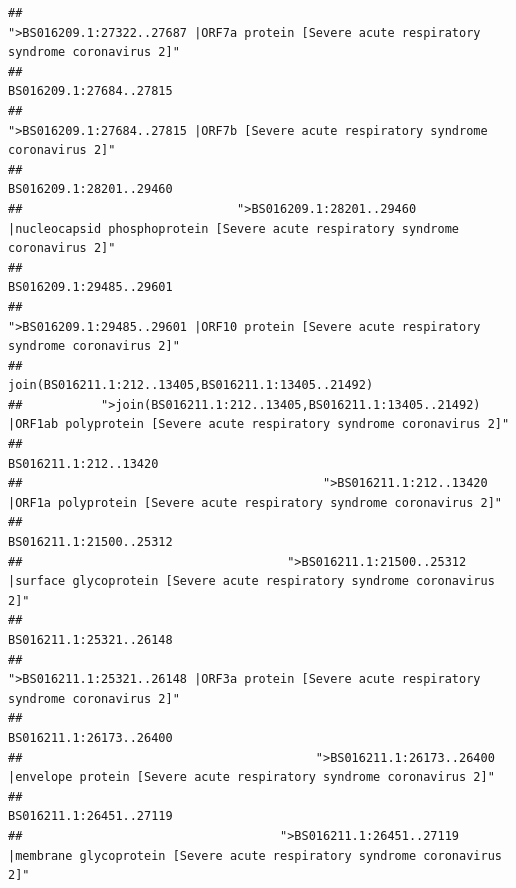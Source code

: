 \documentclass[
]{article}
\begin{document}
\begin{verbatim}
##                                            ">BS016209.1:27322..27687 |ORF7a protein [Severe acute respiratory syndrome coronavirus 2]" 
##                                                                                                                BS016209.1:27684..27815 
##                                                    ">BS016209.1:27684..27815 |ORF7b [Severe acute respiratory syndrome coronavirus 2]" 
##                                                                                                                BS016209.1:28201..29460 
##                              ">BS016209.1:28201..29460 |nucleocapsid phosphoprotein [Severe acute respiratory syndrome coronavirus 2]" 
##                                                                                                                BS016209.1:29485..29601 
##                                            ">BS016209.1:29485..29601 |ORF10 protein [Severe acute respiratory syndrome coronavirus 2]" 
##                                                                                    join(BS016211.1:212..13405,BS016211.1:13405..21492) 
##           ">join(BS016211.1:212..13405,BS016211.1:13405..21492) |ORF1ab polyprotein [Severe acute respiratory syndrome coronavirus 2]" 
##                                                                                                                  BS016211.1:212..13420 
##                                          ">BS016211.1:212..13420 |ORF1a polyprotein [Severe acute respiratory syndrome coronavirus 2]" 
##                                                                                                                BS016211.1:21500..25312 
##                                     ">BS016211.1:21500..25312 |surface glycoprotein [Severe acute respiratory syndrome coronavirus 2]" 
##                                                                                                                BS016211.1:25321..26148 
##                                            ">BS016211.1:25321..26148 |ORF3a protein [Severe acute respiratory syndrome coronavirus 2]" 
##                                                                                                                BS016211.1:26173..26400 
##                                         ">BS016211.1:26173..26400 |envelope protein [Severe acute respiratory syndrome coronavirus 2]" 
##                                                                                                                BS016211.1:26451..27119 
##                                    ">BS016211.1:26451..27119 |membrane glycoprotein [Severe acute respiratory syndrome coronavirus 2]" 

\end{verbatim}
\end{document}
